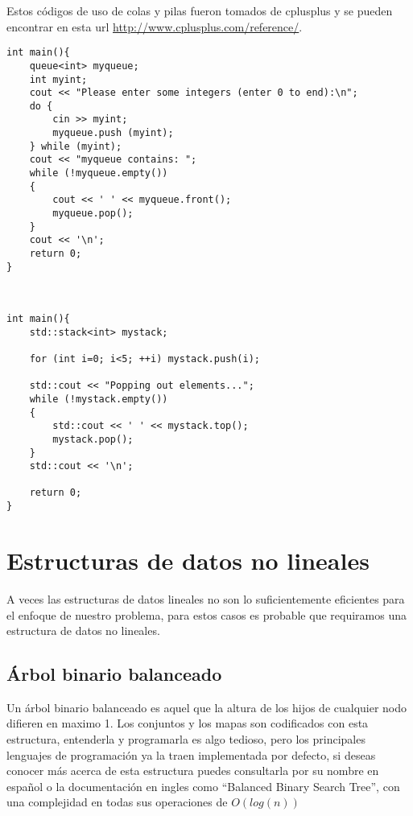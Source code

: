 Estos códigos de uso de colas y pilas fueron tomados de cplusplus y se pueden encontrar en esta url \url{http://www.cplusplus.com/reference/}.
\\\begin{minipage}{\textwidth}
\begin{lstlisting}[style=C,caption=cola.cpp]
int main(){
    queue<int> myqueue;
    int myint;
    cout << "Please enter some integers (enter 0 to end):\n";
    do {
        cin >> myint;
        myqueue.push (myint);
    } while (myint);
    cout << "myqueue contains: ";
    while (!myqueue.empty())
    {
        cout << ' ' << myqueue.front();
        myqueue.pop();
    }
    cout << '\n';
    return 0;
}

\end{lstlisting}
\end{minipage}
\\\begin{minipage}{\textwidth}
\begin{lstlisting}[style=C,caption=pila.cpp]
int main(){
    std::stack<int> mystack;

    for (int i=0; i<5; ++i) mystack.push(i);

    std::cout << "Popping out elements...";
    while (!mystack.empty())
    {
        std::cout << ' ' << mystack.top();
        mystack.pop();
    }
    std::cout << '\n';

    return 0;
}
\end{lstlisting}
\end{minipage}

\section{Estructuras de datos no lineales}

A veces las estructuras de datos lineales no son lo suficientemente eficientes para el enfoque de nuestro problema, para estos casos es probable que requiramos una estructura de datos no lineales.
\subsection{Árbol binario balanceado}
Un árbol binario balanceado es aquel que la altura de los hijos de cualquier nodo difieren en maximo 1. Los conjuntos y los mapas son codificados con esta estructura, entenderla y programarla es algo tedioso, pero los principales lenguajes de programación ya la traen implementada por defecto, si deseas conocer más acerca de esta estructura puedes consultarla por su nombre en español o la documentación en ingles como ``Balanced Binary Search Tree'', con una complejidad en todas sus operaciones de $O(log(n))$
